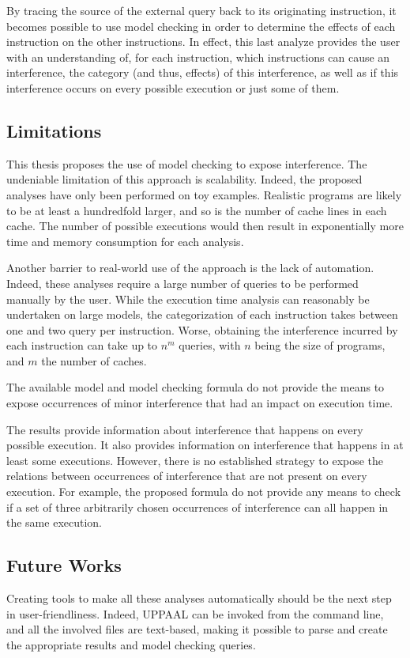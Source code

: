 By tracing the source of the external query back to its originating
instruction, it becomes possible to use model checking in order to determine
the effects of each instruction on the other instructions. In effect, this last
analyze provides the user with an understanding of, for each instruction, which
instructions can cause an interference, the category (and thus, effects) of
this interference, as well as if this interference occurs on every possible
execution or just some of them.

\subsection{Limitations}
This thesis proposes the use of model checking to expose interference. The
undeniable limitation of this approach is scalability. Indeed, the proposed
analyses have only been performed on toy examples. Realistic programs are
likely to be at least a hundredfold larger, and so is the number of cache lines
in each cache. The number of possible executions would then result in
exponentially more time and memory consumption for each analysis.

Another barrier to real-world use of the approach is the lack of automation.
Indeed, these analyses require a large number of queries to be performed
manually by the user. While the execution time analysis can reasonably be
undertaken on large models, the categorization of each instruction takes between
one and two query per instruction. Worse, obtaining the interference incurred by
each instruction can take up to $n^m$ queries, with $n$ being the size of
programs, and $m$ the number of caches.

The available model and model checking formula do not provide the means to
expose occurrences of minor interference that had an impact on execution time.

The results provide information about interference that happens on every
possible execution. It also provides information on interference that happens
in at least some executions. However, there is no established strategy to expose
the relations between occurrences of interference that are not present on every
execution. For example, the proposed formula do not provide any means to check
if a set of three arbitrarily chosen occurrences of interference can all happen
in the same execution.

\subsection{Future Works}
Creating tools to make all these analyses automatically should be the next step
in user-friendliness. Indeed, UPPAAL can be invoked from the command line, and
all the involved files are text-based, making it possible to parse and create
the appropriate results and model checking queries.

